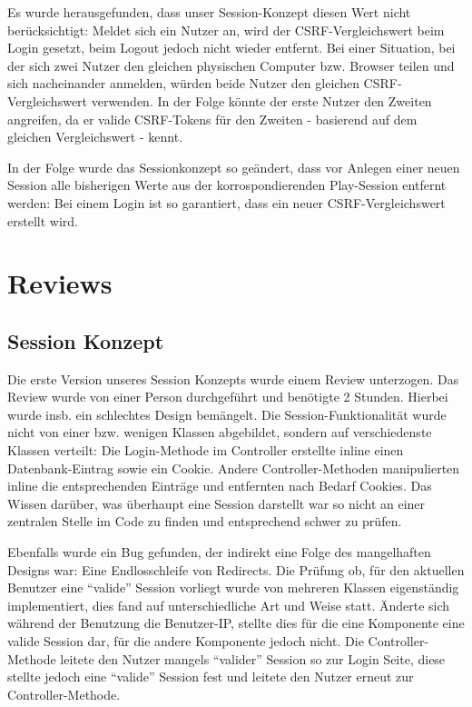 \documentclass[12pt,DIV14,BCOR10mm,a4paper,parskip=half-,headsepline,headinclude,english,ngerman,bibliography=totocnumbered]{scrreprt}
\begin{document}
Es wurde herausgefunden, dass unser Session-Konzept diesen Wert nicht berücksichtigt: Meldet sich ein Nutzer an, wird der CSRF-Vergleichswert beim Login gesetzt, beim Logout jedoch nicht wieder entfernt. Bei einer Situation, bei der sich zwei Nutzer den gleichen physischen Computer bzw. Browser teilen und sich nacheinander anmelden, würden beide Nutzer den gleichen CSRF-Vergleichswert verwenden. In der Folge könnte der erste Nutzer den Zweiten angreifen, da er valide CSRF-Tokens für den Zweiten - basierend auf dem gleichen Vergleichswert - kennt.

In der Folge wurde das Sessionkonzept so geändert, dass vor Anlegen einer neuen Session alle bisherigen Werte aus der korrospondierenden Play-Session entfernt werden: Bei einem Login ist so garantiert, dass ein neuer CSRF-Vergleichswert erstellt wird.


\section{Reviews}
\subsection{Session Konzept}
Die erste Version unseres Session Konzepts wurde einem Review unterzogen. Das Review wurde von einer Person durchgeführt und benötigte 2 Stunden. Hierbei wurde insb. ein schlechtes Design bemängelt. Die Session-Funktionalität wurde nicht von einer bzw. wenigen Klassen abgebildet, sondern auf verschiedenste Klassen verteilt: Die Login-Methode im Controller erstellte inline einen Datenbank-Eintrag sowie ein Cookie. Andere Controller-Methoden manipulierten inline die entsprechenden Einträge und entfernten nach Bedarf Cookies. Das Wissen darüber, was überhaupt eine Session darstellt war so nicht an einer zentralen Stelle im Code zu finden und entsprechend schwer zu prüfen.

Ebenfalls wurde ein Bug gefunden, der indirekt eine Folge des mangelhaften Designs war: Eine Endlosschleife von Redirects. Die Prüfung ob, für den aktuellen Benutzer eine \enquote{valide} Session vorliegt wurde von mehreren Klassen eigenständig implementiert, dies fand auf unterschiedliche Art und Weise statt. Änderte sich während der Benutzung die Benutzer-IP, stellte dies für die eine Komponente eine valide Session dar, für die andere Komponente jedoch nicht. Die Controller-Methode leitete den Nutzer mangels \enquote{valider} Session so zur Login Seite, diese stellte jedoch eine \enquote{valide} Session fest und leitete den Nutzer erneut zur Controller-Methode.
\end{document}
